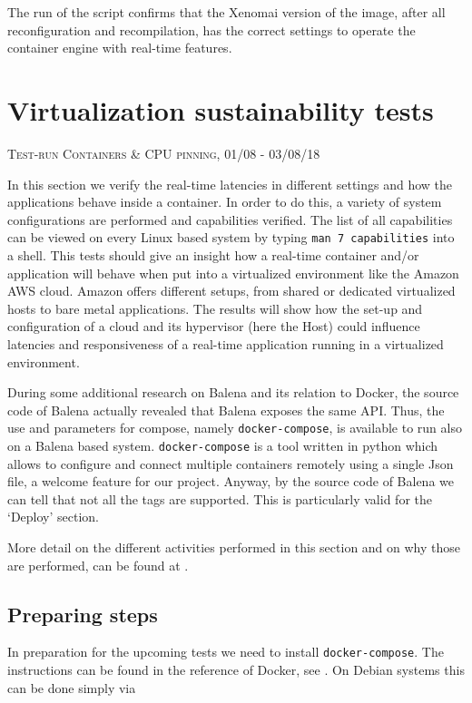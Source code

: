 \documentclass[]{scrartcl}
\begin{document}
The run of the script confirms that the Xenomai version of the image, after all reconfiguration and recompilation, has the correct settings to operate the container engine with real-time features.

\section{Virtualization sustainability tests}
\label{sec:virtsust}
{\small\textsc{Test-run Containers \& CPU pinning, 01/08 - 03/08/18} \bigskip}

In this section we verify the real-time latencies in different settings and how the applications behave inside a container. In order to do this, a variety of system configurations are performed and capabilities verified. The list of all capabilities can be viewed on every Linux based system by typing \texttt{man 7 capabilities} into a shell. This tests should give an insight how a real-time container and/or application will behave when put into a virtualized environment like the Amazon AWS cloud. Amazon offers different setups, from shared or dedicated virtualized hosts to bare metal applications. The results will show how the set-up and configuration of a cloud and its  hypervisor (here the Host) could influence latencies and responsiveness of a real-time application running in a virtualized environment.

During some additional research on Balena and its relation to Docker, the source code of Balena actually revealed that Balena exposes the same API. Thus, the use and parameters for compose, namely \texttt{docker-compose}, is available to run also on a Balena based system.
\texttt{docker-compose} is a tool written in python which allows to configure and connect multiple containers remotely using a single Json file, a welcome feature for our project.
Anyway, by the source code of Balena we can tell that not all the tags are supported. This is particularly valid for the `Deploy' section. 

More detail on the different activities performed in this section and on why those are performed, can be found at \cite{lrt01}.

\subsection{Preparing steps}

In preparation for the upcoming tests we need to install \texttt{docker-compose}.
The instructions can be found in the reference of Docker, see \cite{docker05}. 
On Debian systems this can be done simply via 
\end{document}
